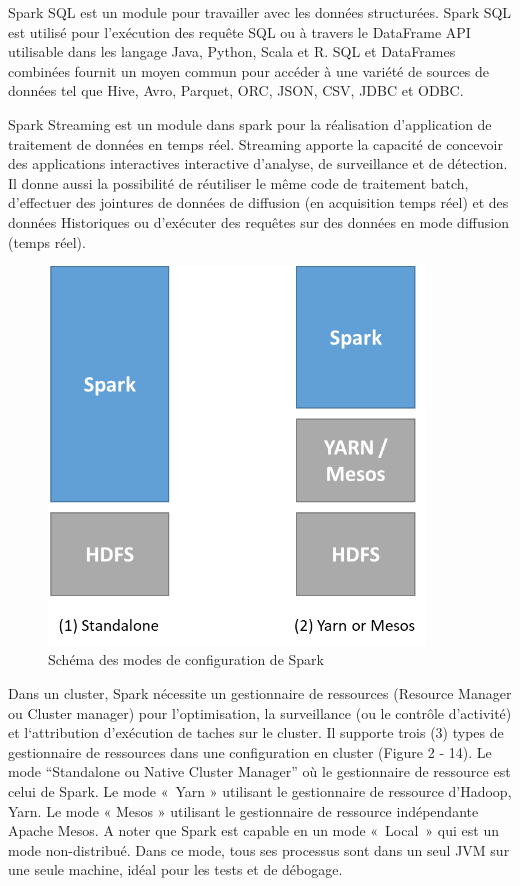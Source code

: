 \documentclass[12pt,french]{book}
\begin{document}
Spark SQL est un module pour travailler avec les données structurées.
Spark SQL est utilisé pour l’exécution des requête SQL ou à travers le DataFrame API utilisable dans les langage Java, Python, Scala et R.
SQL et DataFrames combinées fournit un moyen commun pour accéder à une variété de sources de données tel que Hive, Avro, Parquet, ORC, JSON, CSV, JDBC et ODBC.

Spark Streaming est un module dans spark pour la réalisation d’application de traitement de données en temps réel.
Streaming apporte la capacité de concevoir des applications interactives interactive d’analyse, de surveillance et de détection.
Il donne aussi la possibilité de réutiliser le même code de traitement batch, d’effectuer des jointures de données de diffusion (en acquisition temps réel) et des données Historiques ou d’exécuter des requêtes sur des données en mode diffusion (temps réel).

\begin{figure}[h]
	\centering
	\includegraphics[width=10cm]{sparkConfig}
	\caption{Schéma des modes de configuration de Spark}
\end{figure}

Dans un cluster, Spark nécessite un gestionnaire de ressources (Resource Manager ou Cluster manager) pour l’optimisation, la surveillance (ou le contrôle d’activité) et l‘attribution d’exécution de taches sur le cluster.
Il supporte trois (3) types de gestionnaire de ressources dans une configuration en cluster (Figure 2 - 14).
Le mode “Standalone ou Native Cluster Manager” où le gestionnaire de ressource est celui de Spark.
Le mode « Yarn » utilisant le gestionnaire de ressource d’Hadoop, Yarn.
Le mode « Mesos » utilisant le gestionnaire de ressource indépendante Apache Mesos.
A noter que Spark est capable en un mode « Local » qui est un mode non-distribué.
Dans ce mode, tous ses processus sont dans un seul JVM sur une seule machine, idéal pour les tests et de débogage.
\end{document}
